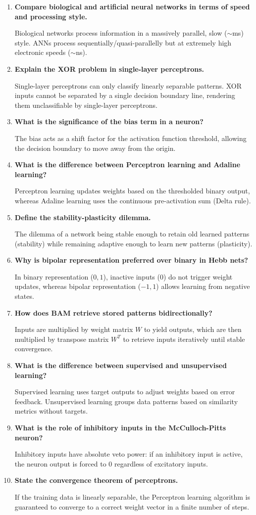 \documentclass[12pt,a4paper]{article}
\newcommand{\Q}[1]{\textbf{#1}\par\noindent\ignorespaces}
\begin{document}
\begin{tcolorbox}[exambox, title={\textbf{Frequently Asked / Viva Questions}}]
\begin{enumerate}[leftmargin=*, itemsep=3.5pt, label=\arabic*.]
  \item \Q{Compare biological and artificial neural networks in terms of speed and processing style.} Biological networks process information in a massively parallel, slow ($\sim$ms) style. ANNs process sequentially/quasi-parallelly but at extremely high electronic speeds ($\sim$ns).
  \item \Q{Explain the XOR problem in single-layer perceptrons.} Single-layer perceptrons can only classify linearly separable patterns. XOR inputs cannot be separated by a single decision boundary line, rendering them unclassifiable by single-layer perceptrons.
  \item \Q{What is the significance of the bias term in a neuron?} The bias acts as a shift factor for the activation function threshold, allowing the decision boundary to move away from the origin.
  \item \Q{What is the difference between Perceptron learning and Adaline learning?} Perceptron learning updates weights based on the thresholded binary output, whereas Adaline learning uses the continuous pre-activation sum (Delta rule).
  \item \Q{Define the stability-plasticity dilemma.} The dilemma of a network being stable enough to retain old learned patterns (stability) while remaining adaptive enough to learn new patterns (plasticity).
  \item \Q{Why is bipolar representation preferred over binary in Hebb nets?} In binary representation ($0,1$), inactive inputs ($0$) do not trigger weight updates, whereas bipolar representation ($-1,1$) allows learning from negative states.
  \item \Q{How does BAM retrieve stored patterns bidirectionally?} Inputs are multiplied by weight matrix $W$ to yield outputs, which are then multiplied by transpose matrix $W^T$ to retrieve inputs iteratively until stable convergence.
  \item \Q{What is the difference between supervised and unsupervised learning?} Supervised learning uses target outputs to adjust weights based on error feedback. Unsupervised learning groups data patterns based on similarity metrics without targets.
  \item \Q{What is the role of inhibitory inputs in the McCulloch-Pitts neuron?} Inhibitory inputs have absolute veto power: if an inhibitory input is active, the neuron output is forced to $0$ regardless of excitatory inputs.
  \item \Q{State the convergence theorem of perceptrons.} If the training data is linearly separable, the Perceptron learning algorithm is guaranteed to converge to a correct weight vector in a finite number of steps.
\end{enumerate}
\end{tcolorbox}
\end{document}
